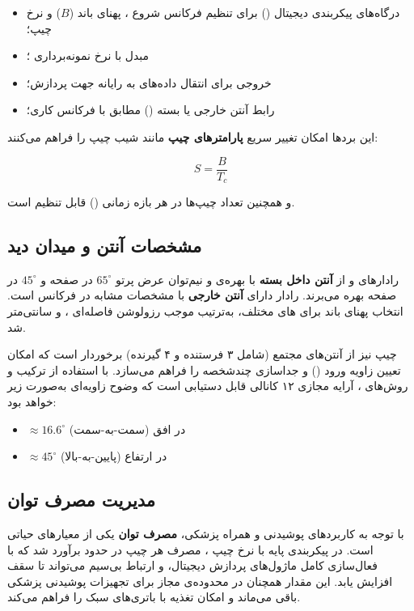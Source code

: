 \begin{itemize}
  \item درگاه‌های پیکربندی دیجیتال () برای تنظیم فرکانس شروع ، پهنای باند ($B$) و نرخ چیپ؛
  \item مبدل  با نرخ نمونه‌برداری ؛
  \item خروجی  برای انتقال داده‌های  به رایانه جهت پردازش؛
  \item رابط آنتن خارجی یا بسته () مطابق با فرکانس کاری؛
\end{itemize}

این بردها امکان تغییر سریع \textbf{پارامترهای چیپ} مانند شیب چیپ را فراهم می‌کنند:

\begin{equation}
S = \frac{B}{T_c}
\label{eq:chirp_slope}
\end{equation}

و همچنین تعداد چیپ‌ها در هر بازه زمانی () قابل تنظیم است.

\subsection{مشخصات آنتن و میدان دید}
\label{sec:antenna-fov}

رادارهای  و  از \textbf{آنتن داخل بسته} با بهره‌ی  و نیم‌توان عرض پرتو $65^\circ$ در صفحه  و $45^\circ$ در صفحه  بهره می‌برند. رادار  دارای \textbf{آنتن خارجی} با مشخصات مشابه در فرکانس  است. انتخاب پهنای باند  برای های مختلف، به‌ترتیب موجب رزولوشن فاصله‌ای ،  و  سانتی‌متر شد.

چیپ  نیز از آنتن‌‌های مجتمع  (شامل ۳ فرستنده و ۴ گیرنده) برخوردار است که امکان تعیین زاویه ورود () و جداسازی چندشخصه را فراهم می‌سازد. با استفاده از ترکیب  و روش‌های ، آرایه مجازی ۱۲ کانالی قابل دستیابی است که وضوح زاویه‌ای به‌صورت زیر خواهد بود:

\begin{itemize}
  \item $\approx 16.6^\circ$ در افق (سمت-به-سمت)
  \item $\approx 45^\circ$ در ارتفاع (پایین-به-بالا)
\end{itemize}

\subsection{مدیریت مصرف توان}
\label{sec:power-management}
با توجه به کاربردهای پوشیدنی و همراه پزشکی، \textbf{مصرف توان} یکی از معیارهای حیاتی است. در پیکربندی پایه با نرخ چیپ ، مصرف هر چیپ در حدود  برآورد شد که با فعال‌سازی کامل ماژول‌های پردازش دیجیتال،  و ارتباط بی‌سیم می‌تواند تا سقف  افزایش یابد. این مقدار همچنان در محدوده‌ی مجاز برای تجهیزات پوشیدنی پزشکی باقی می‌ماند و امکان تغذیه با باتری‌های سبک را فراهم می‌کند.
\cite{marty2024frequency}